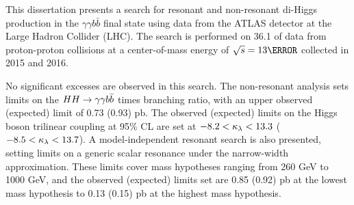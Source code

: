 



This dissertation presents a search for resonant and non-resonant di-Higgs production in the $\gamma \gamma b \bar{b}$ final state using data from the ATLAS detector at the Large Hadron Collider (LHC). The search is performed on 36.1 \ifb of data from proton-proton collisions at a center-of-mass energy of $\sqrt{s} = \unit{13}{\TeV}$ collected in 2015 and 2016.

No significant excesses are observed in this search. The non-resonant analysis sets limits on the $HH\rightarrow\gamma\gamma b\bar{b}$ \xsec times branching ratio, with an upper observed (expected) limit of 0.73 (0.93) pb. The observed (expected) limits on the Higgs boson trilinear coupling at 95\% \gls{CL} are set at $-8.2 < \kappa_{\lambda} < 13.3$ ($-8.5 < \kappa_{\lambda} < 13.7$). A model-independent resonant search is also presented, setting limits on a generic scalar resonance under the narrow-width approximation. These limits cover mass hypotheses ranging from 260 GeV to 1000 GeV, and the observed (expected) limits set are 0.85 (0.92) pb at the lowest mass hypothesis to 0.13 (0.15) pb at the highest mass hypothesis.


